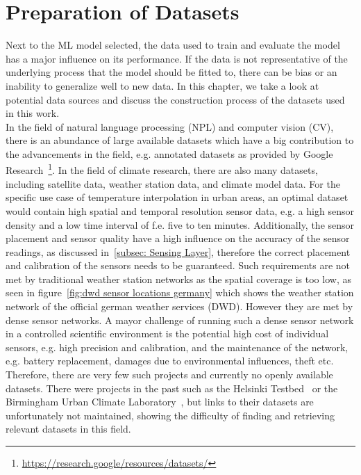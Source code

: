 \chapter{Preparation of Datasets}
\label{chap:preparations data sets}

Next to the ML model selected, the data used to train and evaluate the model has a major influence on its performance. If the data is not representative of the underlying process that the model should be fitted to, there can be bias or an inability to generalize well to new data. In this chapter, we take a look at potential data sources and discuss the construction process of the datasets used in this work.\\
In the field of natural language processing (NPL) and computer vision (CV), there is an abundance of large available datasets which have a big contribution to the advancements in the field, e.g. annotated datasets as provided by Google Research~\footnote{\url{https://research.google/resources/datasets/}}. In the field of climate research, there are also many datasets, including satellite data, weather station data, and climate model data. For the specific use case of temperature interpolation in urban areas, an optimal dataset would contain high spatial and temporal resolution sensor data, e.g. a high sensor density and a low time interval of f.e. five to ten minutes. Additionally, the sensor placement and sensor quality have a high influence on the accuracy of the sensor readings, as discussed in~\ref{subsec: Sensing Layer}, therefore the correct placement and calibration of the sensors needs to be guaranteed. Such requirements are not met by traditional weather station networks as the spatial coverage is too low, as seen in figure~\ref{fig:dwd sensor locations germany} which shows the weather station network of the official german weather services (DWD).
However they are met by dense sensor networks. A mayor challenge of running such a dense sensor network in a controlled scientific environment is the potential high cost of individual sensors, e.g. high precision and calibration, and the maintenance of the network, e.g. battery replacement, damages due to environmental influences, theft etc. Therefore, there are very few such projects and currently no openly available datasets. There were projects in the past such as the Helsinki Testbed~\cite{koskinen2011helsinki} or the Birmingham Urban Climate Laboratory~\cite{warren2016birmingham}, but links to their datasets are unfortunately not maintained, showing the difficulty of finding and retrieving relevant datasets in this field.\\
